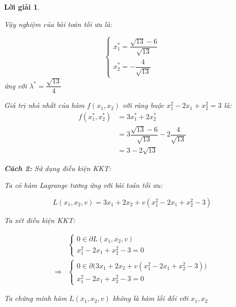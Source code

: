 \documentclass[14pt, a4paper]{article}
\theoremstyle{sltheorem}
\theoremstyle{soltheorem}
\newtheorem*{loigiai}{Lời giải}
\begin{document}
\begin{loigiai}
\begin{itemize}
            Vậy nghiệm của bài toán tối ưu là:

            \begin{equation*}
                \begin{cases} x_1^* = \dfrac{\sqrt{13}-6}{\sqrt{13}} \\ x_2^* = -\dfrac{4}{\sqrt{13}} \end{cases}
            \end{equation*}
            ứng với $\lambda^* = \dfrac{\sqrt{13}}{4}$

            Giá trị nhỏ nhất của hàm $f(x_1, x_2)$ với ràng buộc $x_1^2 - 2x_1 + x_2^2 =3$ là:
            \begin{equation*}
                \begin{aligned}
                f(x_1^*, x_2^*)&=3x_1^* + 2x_2^* \\&= 3 \dfrac{\sqrt{13}-6}{\sqrt{13}} - 2 \dfrac{4}{\sqrt{13}}\\
                &= 3 - 2\sqrt{13}
                \end{aligned}
            \end{equation*} 
        \end{itemize}
        \textbf{Cách 2:} Sử dụng điều kiện KKT:

        Ta có hàm Lagrange tương ứng với bài toán tối ưu:

        \begin{equation*}
            L(x_1, x_2, v) = 3 x_1 + 2 x_2 + v(x_1^2 - 2x_1 + x_2^2 - 3)
        \end{equation*}

        Ta xét điều kiện KKT:

        \begin{equation*}
            \begin{aligned}
            &\begin{cases} 0 \in \partial L(x_1, x_2, v) \\ x_1^2 - 2x_1 + x_2^2 - 3 = 0 \end{cases} \\
            \Rightarrow &\begin{cases} 0 \in \partial \Big ( 3 x_1 + 2 x_2 + v(x_1^2 - 2x_1 + x_2^2 - 3) \Big) \\ x_1^2 - 2x_1 + x_2^2 - 3 = 0  \end{cases}
            \end{aligned}
        \end{equation*}

        Ta chứng minh hàm $L(x_1, x_2, v)$ không là hàm lồi đối với $x_1, x_2$


\end{loigiai}
\end{document}
